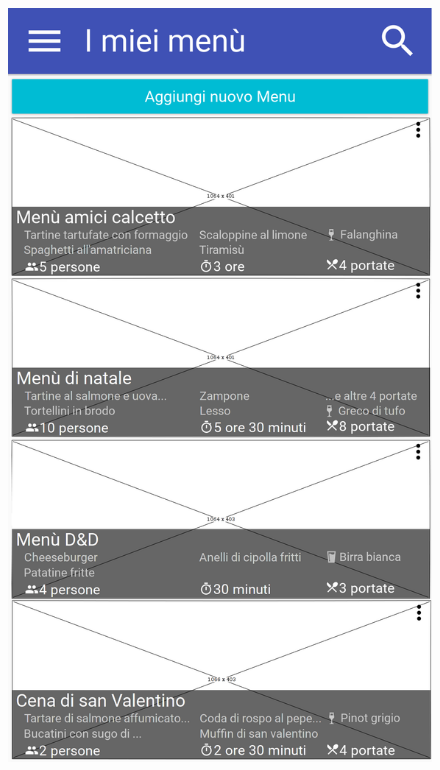 \begin{figure}[H]
	\begin{minipage}{.49\textwidth}
		\includegraphics[width=\textwidth]{img/wireframe/i_miei_men.png}
	\end{minipage}
	\begin{minipage}{.49\textwidth}

\end{minipage}
\end{figure}
